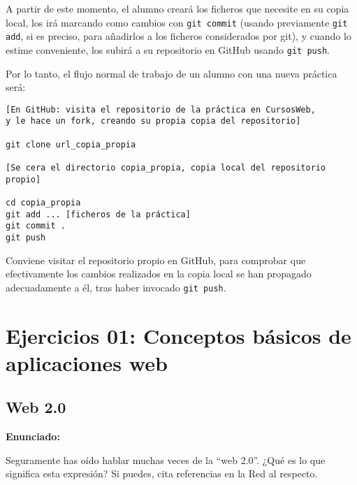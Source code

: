 A partir de este momento, el alumno creará los ficheros que necesite en su copia local, los irá marcando como cambios con \verb|git commit| (usando previamente \verb|git add|, si es preciso, para añadirlos a los ficheros considerados por git), y cuando lo estime conveniente, los subirá a su repositorio en GitHub usando \verb|git push|.

Por lo tanto, el flujo normal de trabajo de un alumno con una nueva práctica será:

\begin{verbatim}
[En GitHub: visita el repositorio de la práctica en CursosWeb,
y le hace un fork, creando su propia copia del repositorio]

git clone url_copia_propia

[Se cera el directorio copia_propia, copia local del repositorio propio]

cd copia_propia
git add ... [ficheros de la práctica]
git commit .
git push
\end{verbatim}

Conviene visitar el repositorio propio en GitHub, para comprobar que efectivamente los cambios realizados en la copia local se han propagado adecuadamente a él, tras haber invocado \verb|git push|.

\section{Ejercicios 01: Conceptos básicos de aplicaciones web}

\subsection{Web 2.0}
\label{subsec:web-20}

\textbf{Enunciado:}

Seguramente has oído hablar muchas veces de la ``web 2.0''. ¿Qué es lo que significa esta expresión? Si puedes, cita referencias en la Red al respecto.

